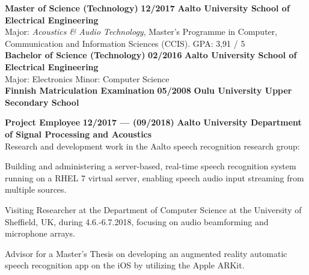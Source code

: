 \documentclass[8pt,a4paper,oneside]{article}
\newcommand{\myrule}{\vspace{0.5mm} {\color{lightgray}{\hrule height 0.5pt width \textwidth depth 0pt}} \vspace{1mm}}
\newcommand{\titledate}[2]{{\bfseries \color{textcolor}  \fontsize{11.5}{11.5}\selectfont #1} \hfill \textbf{#2} \myrule}
\newcommand{\workplace}[1]{{\bfseries \fontsize{10.5}{10.5}\selectfont #1}}
\newcommand{\sectitle}[1]{{\sc \bfseries \LARGE #1}}
\newcommand{\boxarc}{2.5mm}
\newcommand{\boxtop}{1.5mm}
\newcommand{\boxskip}{\vspace{0.92\baselineskip}}
\begin{document}
\vspace{0.5mm} %
	
\begin{minipage}[t]{0.638\textwidth}
	
	
	\begin{tcolorbox}[top=1mm,bottom=1mm,right=1mm,left=1mm,arc=\boxarc,toptitle=\boxtop,bottomtitle=1mm,title=\sectitle{Education},box align=top]
		\titledate{Master of Science (Technology)}{12/2017}
		\workplace{Aalto University School of Electrical Engineering} \\
		Major: \textit{Acoustics \& Audio Technology}, Master's Programme in Computer, Communication and Information Sciences (CCIS). GPA: 3,91 / 5 \\
		
		\titledate{Bachelor of Science (Technology)}{02/2016}
		\workplace{Aalto University School of Electrical Engineering} \\
		 \hspace*{0.25mm} {\large \textbullet} Major: Electronics \hspace{3mm} {\large \textbullet} Minor: Computer Science \\
		
		\titledate{Finnish Matriculation Examination}{05/2008}
		\workplace{Oulu University Upper Secondary School}
	\end{tcolorbox} \boxskip
	
	\begin{tcolorbox}[top=1mm,bottom=1mm,right=1mm,left=1mm,arc=\boxarc,toptitle=\boxtop,bottomtitle=1mm,title=\sectitle{Experience},box align=bottom]
		
		\titledate{Project Employee}{12/2017 --- (09/2018)}
		\workplace{Aalto University Department of Signal Processing and Acoustics} \\
		Research and development work in the Aalto speech recognition research group:
		\begin{cvlist}
			\item Building and administering a server-based, real-time speech recognition system running on a RHEL 7 virtual server, enabling speech audio input streaming from multiple sources.
			\item Visiting Researcher at the Department of Computer Science at the University of Sheffield, UK, during 4.6.-6.7.2018, focusing on audio beamforming and microphone arrays.
			\item Advisor for a Master's Thesis on developing an augmented reality automatic speech recognition app on the iOS by utilizing the Apple ARKit. \\
		\end{cvlist}
		

\end{tcolorbox}
\end{minipage}
\end{document}

